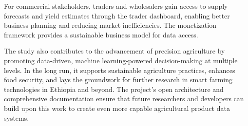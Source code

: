 For commercial stakeholders, traders and wholesalers gain access to supply forecasts and yield estimates through the trader dashboard, enabling better business planning and reducing market inefficiencies. The monetization framework provides a sustainable business model for data access.

The study also contributes to the advancement of precision agriculture by promoting data-driven, machine learning-powered decision-making at multiple levels. In the long run, it supports sustainable agriculture practices, enhances food security, and lays the groundwork for further research in smart farming technologies in Ethiopia and beyond. The project's open architecture and comprehensive documentation ensure that future researchers and developers can build upon this work to create even more capable agricultural product data systems.
